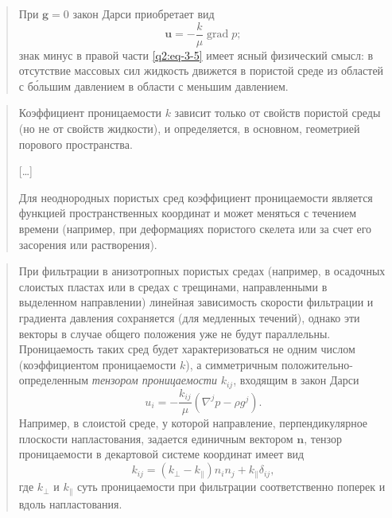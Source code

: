 \documentclass[12pt,a4paper]{article}
\DeclareMathOperator{\grad}{grad}
\newenvironment{textquote}{\begin{quote}\sloppy}{\end{quote}}
\begin{document}
\begin{textquote}
При $\boldsymbol{g}=0$ закон Дарси приобретает вид
\begin{equation}
\boldsymbol{u}=-\frac{k}{\mu}\grad p;
\tag{3.5}\label{q2:eq-3-5}
\end{equation}
знак минус в правой части \eqref{q2:eq-3-5} имеет ясный физический смысл: в отсутствие массовых сил жидкость движется в пористой среде из областей с б\'ольшим давлением в области с меньшим давлением.
\end{textquote}

\begin{textquote}
Коэффициент проницаемости $k$ зависит только от свойств пористой среды (но не от свойств жидкости), и определяется, в основном, геометрией порового пространства.

[…]

Для неоднородных пористых сред коэффициент проницаемости является функцией пространственных координат и может меняться с течением времени (например, при деформациях пористого скелета или за счет его засорения или растворения).
\end{textquote}

\begin{textquote}
При фильтрации в анизотропных пористых средах (например, в осадочных слоистых пластах или в средах с трещинами, направленными в выделенном направлении) линейная зависимость скорости фильтрации и градиента давления сохраняется (для медленных течений), однако эти векторы в случае общего положения уже не будут параллельны. Проницаемость таких сред будет характеризоваться не одним числом (коэффициентом проницаемости $k$), а симметричным положительно-определенным \textit{тензором проницаемости} $k_{ij}$, входящим в закон Дарси
\[
u_i=-\frac{k_{ij}}{\mu}(\nabla^jp-\rho g^j).
\]
Например, в слоистой среде, у которой направление, перпендикулярное плоскости напластования, задается единичным вектором $\boldsymbol{n}$, тензор проницаемости в декартовой системе координат имеет вид
\[
k_{ij}=(k_\perp-k_\parallel)n_in_j+k_\parallel\delta_{ij},
\]
где $k_\perp$ и $k_\parallel$ суть проницаемости при фильтрации соответственно поперек и вдоль напластования.
\end{textquote}
\end{document}
